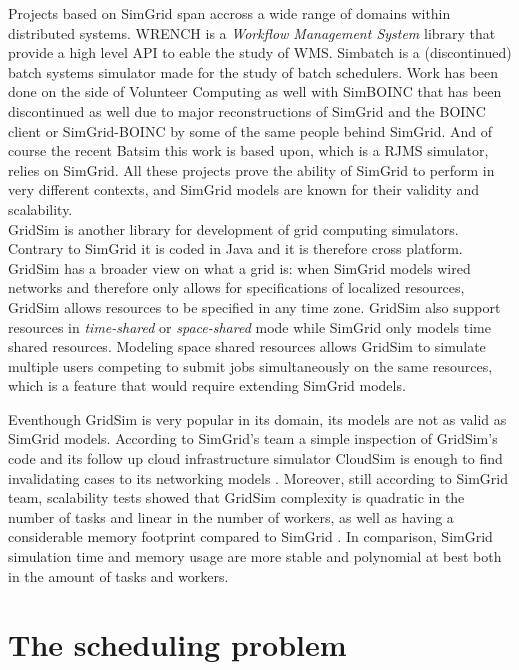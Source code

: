 Projects based on SimGrid span accross a wide range of domains within
distributed systems. WRENCH \cite{wrench} is a \textit{Workflow Management
System} library that provide a high level API to eable the study of WMS.
Simbatch \cite{simbatch} is a (discontinued) batch systems simulator made for
the study of batch schedulers.  Work has been done on the side of Volunteer
Computing as well with SimBOINC \cite{kondo2007simboinc} that has been
discontinued as well due to major reconstructions of SimGrid and the BOINC
client or SimGrid-BOINC \cite{simgrid-boinc} by some of the same people behind
SimGrid. And of course the recent Batsim \cite{dutot:hal-01333471} this work is
based upon, which is a RJMS simulator, relies on SimGrid. All these projects
prove the ability of SimGrid to perform in very different contexts, and SimGrid
models are known for their validity and scalability.\\

GridSim \cite{gridsim} is another library for development of grid computing
simulators. Contrary to SimGrid it is coded in Java and it is therefore cross
platform. GridSim has a broader view on what a grid is: when SimGrid models
wired networks and therefore only allows for specifications of localized
resources, GridSim allows resources to be specified in any time zone. GridSim
also support resources in \textit{time-shared} or \textit{space-shared} mode
while SimGrid only models time shared resources. Modeling space shared
resources allows GridSim to simulate multiple users competing to submit jobs
simultaneously on the same resources, which is a feature that would require
extending SimGrid models.

Eventhough GridSim is very popular in its domain, its models are not as valid
as SimGrid models. According to SimGrid's team a simple inspection of GridSim's
code and its follow up cloud infrastructure simulator CloudSim \cite{cloudsim}
is enough to find invalidating cases to its networking models
\cite{10.1145/2517448}. Moreover, still according to SimGrid team, scalability
tests showed that GridSim complexity is quadratic in the number of tasks and
linear in the number of workers, as well as having a considerable memory
footprint compared to SimGrid \cite{casanova:hal-01017319}. In comparison,
SimGrid simulation time and memory usage are more stable and polynomial at best
both in the amount of tasks and workers.

\section{The scheduling problem}

